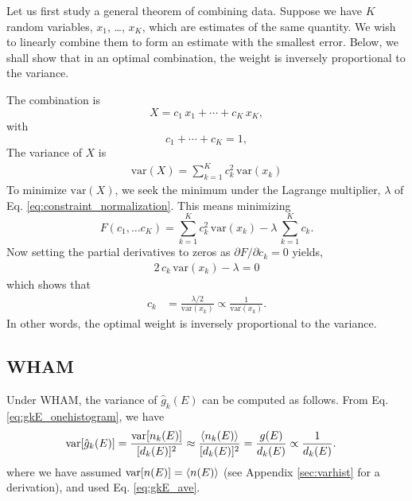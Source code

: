 \documentclass[aip,jcp,preprint,superscriptaddress]{revtex4-1}
\begin{document}
Let us first study a general theorem
of combining data.
%
Suppose we have $K$ random variables,
$x_1$, \dots, $x_K$,
which are estimates of the same quantity.
%
We wish to linearly combine them to
form an estimate with the smallest error.
%
Below, we shall show that
in an optimal combination,
the weight is inversely proportional to the variance.



The combination is
\[
  X = c_1 \, x_1 + \cdots + c_K \, x_K,
\]
with
\begin{equation}
  c_1 + \cdots + c_K = 1,
  \label{eq:constraint_normalization}
\end{equation}
%
The variance of $X$ is
%
\begin{align*}
  \mathrm{var}(X)
=
\sum_{k = 1}^K c_k^2 \, \mathrm{var}(x_k)
\end{align*}
%
To minimize $\mathrm{var}(X)$,
we seek the minimum
under the Lagrange multiplier,
$\lambda$ of Eq. \eqref{eq:constraint_normalization}.
%
This means minimizing
%
\begin{equation}
F(c_1, \dots c_K)
=
\sum_{k = 1}^K c_k^2 \, \mathrm{var}(x_k)
-\lambda \, \sum_{k = 1}^K c_k.
\end{equation}
%
Now
setting the partial derivatives to zeros as
$\partial F/\partial c_k = 0$
yields,
%
\begin{align*}
  2 \, c_k \, \mathrm{var}(x_k) - \lambda = 0
\end{align*}
%
which shows that
\begin{align*}
c_k
&= \frac{ \lambda/2 }{\mathrm{var}(x_k) }
\propto \frac{ 1 } { \mathrm{var}(x_k) }.
\end{align*}
In other words,
the optimal weight
is inversely proportional to the variance.



\subsection{WHAM}



Under WHAM,
the variance of $\hat g_k(E)$ can be computed as follows.
%
From Eq. \eqref{eq:gkE_onehistogram},
we have
%
\begin{align*}
\mathrm{var}[ \hat g_k(E) ]
&=
\frac{ \mathrm{var}[ n_k(E) ] }
{ [ d_k(E) ]^2 }
\approx
\frac{ \langle n_k(E) \rangle }
{ [ d_k(E) ]^2 }
=
\frac{ g(E) } { d_k(E) }
\propto
\frac{ 1 } { d_k(E) }.
\end{align*}
where we have assumed
$\mathrm{var}[ n(E) ] = \langle n(E) \rangle$
(see Appendix \ref{sec:varhist}
for a derivation),
and used Eq. \eqref{eq:gkE_ave}.
\end{document}
